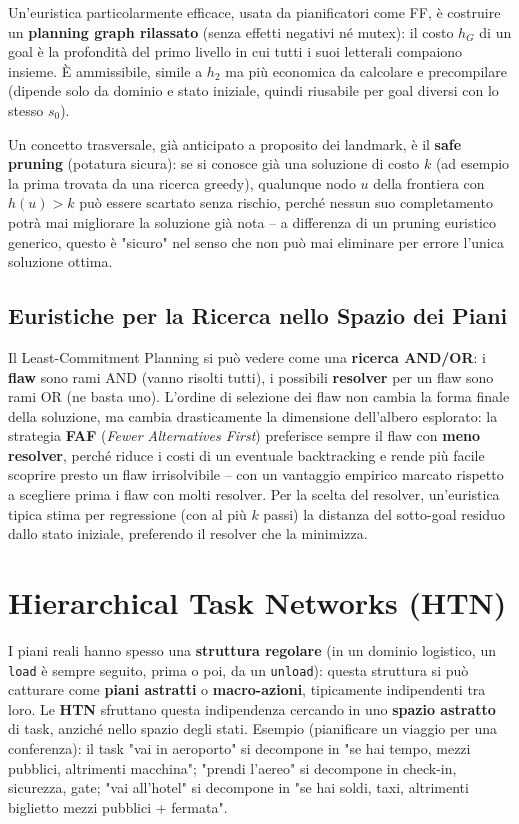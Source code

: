 \documentclass[a4paper,11pt]{article}
\begin{document}
Un'euristica particolarmente efficace, usata da pianificatori come FF, è costruire un \textbf{planning graph rilassato} (senza effetti negativi né mutex): il costo $h_G$ di un goal è la profondità del primo livello in cui tutti i suoi letterali compaiono insieme. È ammissibile, simile a $h_2$ ma più economica da calcolare e precompilare (dipende solo da dominio e stato iniziale, quindi riusabile per goal diversi con lo stesso $s_0$).

Un concetto trasversale, già anticipato a proposito dei landmark, è il \textbf{safe pruning} (potatura sicura): se si conosce già una soluzione di costo $k$ (ad esempio la prima trovata da una ricerca greedy), qualunque nodo $u$ della frontiera con $h(u)>k$ può essere scartato senza rischio, perché nessun suo completamento potrà mai migliorare la soluzione già nota -- a differenza di un pruning euristico generico, questo è "sicuro" nel senso che non può mai eliminare per errore l'unica soluzione ottima.

\subsection{Euristiche per la Ricerca nello Spazio dei Piani}

Il Least-Commitment Planning si può vedere come una \textbf{ricerca AND/OR}: i \textbf{flaw} sono rami AND (vanno risolti tutti), i possibili \textbf{resolver} per un flaw sono rami OR (ne basta uno). L'ordine di selezione dei flaw non cambia la forma finale della soluzione, ma cambia drasticamente la dimensione dell'albero esplorato: la strategia \textbf{FAF} (\emph{Fewer Alternatives First}) preferisce sempre il flaw con \textbf{meno resolver}, perché riduce i costi di un eventuale backtracking e rende più facile scoprire presto un flaw irrisolvibile -- con un vantaggio empirico marcato rispetto a scegliere prima i flaw con molti resolver. Per la scelta del resolver, un'euristica tipica stima per regressione (con al più $k$ passi) la distanza del sotto-goal residuo dallo stato iniziale, preferendo il resolver che la minimizza.

\newpage
\section{Hierarchical Task Networks (HTN)}

I piani reali hanno spesso una \textbf{struttura regolare} (in un dominio logistico, un \texttt{load} è sempre seguito, prima o poi, da un \texttt{unload}): questa struttura si può catturare come \textbf{piani astratti} o \textbf{macro-azioni}, tipicamente indipendenti tra loro. Le \textbf{HTN} sfruttano questa indipendenza cercando in uno \textbf{spazio astratto} di task, anziché nello spazio degli stati. Esempio (pianificare un viaggio per una conferenza): il task "vai in aeroporto" si decompone in "se hai tempo, mezzi pubblici, altrimenti macchina"; "prendi l'aereo" si decompone in check-in, sicurezza, gate; "vai all'hotel" si decompone in "se hai soldi, taxi, altrimenti biglietto mezzi pubblici + fermata".
\end{document}
